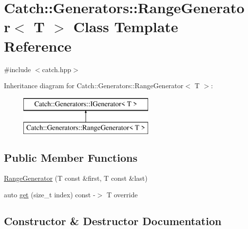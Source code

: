 \hypertarget{class_catch_1_1_generators_1_1_range_generator}{}\section{Catch\+:\+:Generators\+:\+:Range\+Generator$<$ T $>$ Class Template Reference}
\label{class_catch_1_1_generators_1_1_range_generator}


{\ttfamily \#include $<$catch.\+hpp$>$}

Inheritance diagram for Catch\+:\+:Generators\+:\+:Range\+Generator$<$ T $>$\+:\begin{figure}[H]
\begin{center}
\leavevmode
\includegraphics[height=2.000000cm]{class_catch_1_1_generators_1_1_range_generator}
\end{center}
\end{figure}
\subsection*{Public Member Functions}
\begin{DoxyCompactItemize}
\item 
\mbox{\hyperlink{class_catch_1_1_generators_1_1_range_generator_a56c5fcc855bdb668d7b93c2017a7c44c}{Range\+Generator}} (T const \&first, T const \&last)
\item 
auto \mbox{\hyperlink{class_catch_1_1_generators_1_1_range_generator_a78f7f624b7545823d1a683ebf2ac00e7}{get}} (size\+\_\+t index) const -\/$>$ T override
\end{DoxyCompactItemize}


\subsection{Constructor \& Destructor Documentation}
\mbox{\label{class_catch_1_1_generators_1_1_range_generator_a56c5fcc855bdb668d7b93c2017a7c44c}} 
